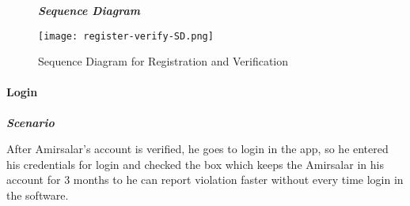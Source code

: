 \begin{figure}[H]
\begin{flushleft}\emph{\textbf{Sequence Diagram}}\end{flushleft}
\caption{Sequence Diagram for Registration and Verification}
\label{fig:register-verify-SD}
\centering
\texttt{[image: register-verify-SD.png]}
\end{figure}

\paragraph{Login}
\hfill \break

\begin{flushleft}\emph{\textbf{Scenario}}\end{flushleft}

After Amirsalar's account is verified, he goes to login in the app, so he entered his credentials for login and checked the box which keeps the Amirsalar in his account for 3 months to he can report violation faster without every time login in the software.



